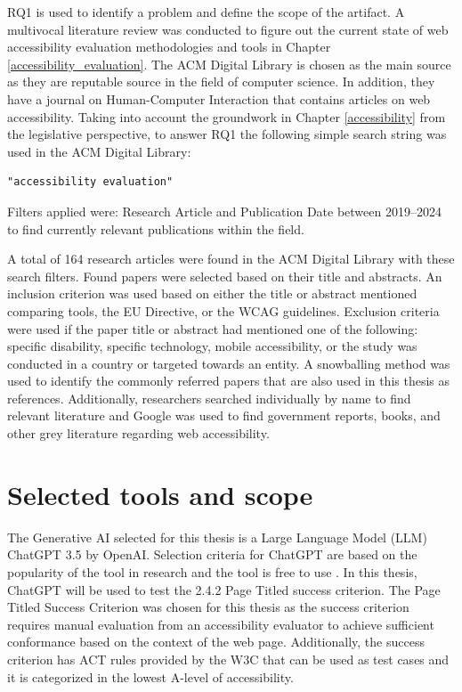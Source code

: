 RQ1 is used to identify a problem and define the scope of the artifact. A multivocal literature review was conducted to figure out the current state of web accessibility evaluation methodologies and tools in Chapter \ref{accessibility_evaluation}. The ACM Digital Library is chosen as the main source as they are reputable source in the field of computer science. In addition, they have a journal on Human-Computer Interaction that contains articles on web accessibility. Taking into account the groundwork in Chapter \ref{accessibility} from the legislative perspective, to answer RQ1 the following simple search string was used in the ACM Digital Library:

\begin{verbatim}
"accessibility evaluation"
\end{verbatim}

Filters applied were: Research Article and Publication Date between 2019--2024 to find currently relevant publications within the field. 

A total of 164 research articles were found in the ACM Digital Library with these search filters. Found papers were selected based on their title and abstracts. An inclusion criterion was used based on either the title or abstract mentioned comparing tools, the EU Directive, or the WCAG guidelines. Exclusion criteria were used if the paper title or abstract had mentioned one of the following: specific disability, specific technology, mobile accessibility, or the study was conducted in a country or targeted towards an entity. A snowballing method was used to identify the commonly referred papers that are also used in this thesis as references. Additionally, researchers searched individually by name to find relevant literature and Google was used to find government reports, books, and other grey literature regarding web accessibility.

\section{Selected tools and scope}

The Generative AI selected for this thesis is a Large Language Model (LLM) ChatGPT 3.5 by OpenAI. Selection criteria for ChatGPT are based on the popularity of the tool in research and the tool is free to use \citep{ouyang2023llm, white2023prompt}. In this thesis, ChatGPT will be used to test the 2.4.2 Page Titled success criterion. The Page Titled Success Criterion was chosen for this thesis as the success criterion requires manual evaluation from an accessibility evaluator to achieve sufficient conformance based on the context of the web page. Additionally, the success criterion has ACT rules provided by the W3C that can be used as test cases and it is categorized in the lowest A-level of accessibility. 

